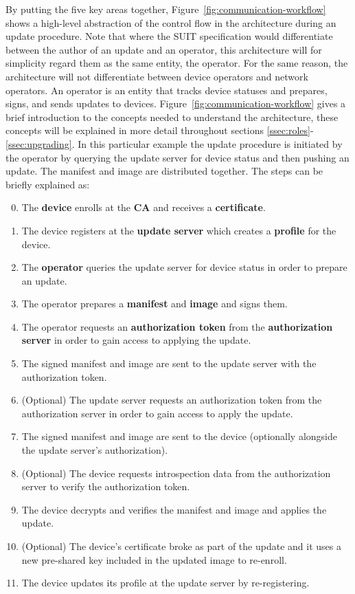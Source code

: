 \documentclass[0-thesis.tex]{subfiles}
\begin{document}
By putting the five key areas together, Figure~\ref{fig:communication-workflow} shows a
high-level abstraction of the control flow in the architecture during an update procedure.
Note that where the SUIT specification would differentiate between the author of an update
and an operator, this architecture will for simplicity regard them as the same entity, the
operator. For the same reason, the architecture will not differentiate between device
operators and network operators. An operator is an entity that tracks device statuses and
prepares, signs, and sends updates to devices. Figure~\ref{fig:communication-workflow}
gives a brief introduction to the concepts needed to understand the architecture, these
concepts will be explained in more detail throughout sections
\ref{ssec:roles}-\ref{ssec:upgrading}. In this particular example the update procedure is
initiated by the operator by querying the update server for device status and then pushing
an update. The manifest and image are distributed together. The steps can be briefly
explained as:

\begin{enumerate}
    \setcounter{enumi}{-1}
    \item The \textbf{device} enrolls at the \textbf{CA} and receives a
            \textbf{certificate}.
    \item The device registers at the \textbf{update server} which creates a \textbf{profile}
            for the device.
    \item The \textbf{operator} queries the update server for device status in order to
            prepare an update.
    \item The operator prepares a \textbf{manifest} and \textbf{image} and signs them.
    \item The operator requests an \textbf{authorization token} from the
            \textbf{authorization server} in order to gain access to applying the update.
    \item The signed manifest and image are sent to the update server with the
            authorization token.
    \item (Optional) The update server requests an authorization token from the authorization server
            in order to gain access to apply the update.
    \item The signed manifest and image are sent to the device (optionally alongside the
            update server's authorization).
    \item (Optional) The device requests introspection data from the authorization server to verify
            the authorization token.
    \item The device decrypts and verifies the manifest and image and applies the update.
    \item (Optional) The device's certificate broke as part of the update and it uses a new
            pre-shared key included in the updated image to re-enroll.
    \item The device updates its profile at the update server by re-registering.
\end{enumerate}
\end{document}
